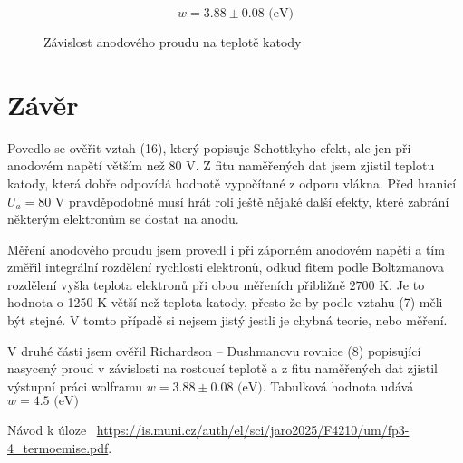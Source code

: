 \documentclass[a4paper,11pt]{article}
\begin{document}
\begin{equation*}
w = 3.88 \pm 0.08 \text{ (eV)}
\end{equation*}

\begin{figure}[h]
    \centering
    
    \caption{Závislost anodového proudu na teplotě katody }
\end{figure}

\section{Závěr}

Povedlo se ověřit vztah (16), který popisuje Schottkyho efekt, ale jen při anodovém napětí větším než 80 V. Z fitu naměřených dat jsem zjistil teplotu katody, která dobře odpovídá hodnotě vypočítané z odporu vlákna. Před hranicí $ U_a = 80 $ V pravděpodobně musí hrát roli ještě nějaké další efekty, které zabrání některým elektronům se dostat na anodu.

Měření anodového proudu jsem provedl i při záporném anodovém napětí a tím změřil integrální rozdělení rychlosti elektronů, odkud fitem podle Boltzmanova rozdělení vyšla teplota elektronů při obou měřeních přibližně $ 2700 $ K. Je to hodnota o 1250 K větší než teplota katody, přesto že by podle vztahu (7) měli být stejné. V tomto případě si nejsem jistý jestli je chybná teorie, nebo měření.

V druhé části jsem ověřil Richardson – Dushmanovu rovnice (8) popisující nasycený proud v závislosti na rostoucí teplotě a z fitu naměřených dat zjistil výstupní práci wolframu $ w = 3.88 \pm 0.08 \text{ (eV)} $. Tabulková hodnota udává $ w = 4.5  \text{ (eV)} $


\begin{thebibliography}{0}
 Návod k úloze ~\url{https://is.muni.cz/auth/el/sci/jaro2025/F4210/um/fp3-4_termoemise.pdf}.   
\end{thebibliography}
\end{document}
